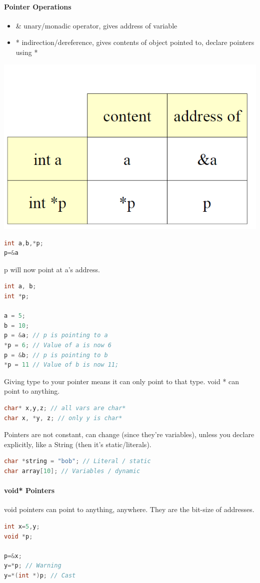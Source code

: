 \documentclass[12 pt]{article}
\begin{document}
\paragraph{Pointer Operations}
\begin{itemize}
	\item \& unary/monadic operator, gives address of variable
	\item * indirection/dereference, gives contents of object pointed to, declare pointers using *
	\end{itemize}
	\includegraphics[scale=0.5]{pont}
\begin{lstlisting}[language=c]
int a,b,*p;
p=&a
\end{lstlisting}
p will now point at a's address.
\begin{lstlisting}[language=c]
int a, b;
int *p;

a = 5;
b = 10;
p = &a; // p is pointing to a
*p = 6; // Value of a is now 6
p = &b; // p is pointing to b
*p = 11 // Value of b is now 11;
\end{lstlisting}
Giving type to your pointer means it can only point to that type. void * can point to anything.
\begin{lstlisting}[language=c]
char* x,y,z; // all vars are char*
char x, *y, z; // only y is char*
\end{lstlisting}
Pointers are not constant, can change (since they're variables), unless you declare explicitly, like a String (then it's static/literals).
\begin{lstlisting}[language=c]
char *string = "bob"; // Literal / static
char array[10]; // Variables / dynamic
\end{lstlisting}
\paragraph{void* Pointers} void pointers can point to anything, anywhere. They are the bit-size of addresses.
\begin{lstlisting}[language=c]
int x=5,y;
void *p;

p=&x;
y=*p; // Warning
y=*(int *)p; // Cast
\end{lstlisting}
\end{document}
